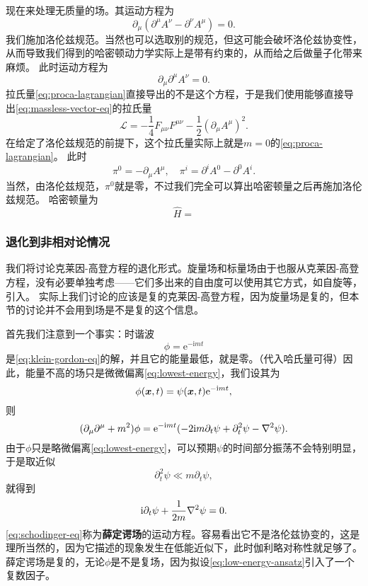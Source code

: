 \documentclass[hyperref, UTF8, a4paper]{ctexart}
\newcommand*{\ii}{\mathrm{i}}
\newcommand*{\ee}{\mathrm{e}}
\begin{document}
现在来处理无质量的场。其运动方程为
\[
    \partial_\mu (\partial^\mu A^\nu - \partial^\nu A^\mu) = 0.
\]
我们施加洛伦兹规范。当然也可以选取别的规范，但这可能会破坏洛伦兹协变性，从而导致我们得到的哈密顿动力学实际上是带有约束的，从而给之后做量子化带来麻烦。
此时运动方程为
\begin{equation}
    \partial_\mu \partial^\mu A^\nu = 0.
    \label{eq:massless-vector-eq}
\end{equation}
拉氏量\eqref{eq:proca-lagrangian}直接导出的不是这个方程，于是我们使用能够直接导出\eqref{eq:massless-vector-eq}的拉氏量
\begin{equation}
    \mathcal{L} = - \frac{1}{4} F_{\mu \nu} F^{\mu \nu} - \frac{1}{2} (\partial_\mu A^\mu)^2.
\end{equation}
在给定了洛伦兹规范的前提下，这个拉氏量实际上就是$m=0$的\eqref{eq:proca-lagrangian}。
此时
\begin{equation}
    \pi^0 = -\partial_\mu A^\mu, \quad \pi^i = \partial^i A^0 - \partial^0 A^i.
\end{equation}
当然，由洛伦兹规范，$\pi^0$就是零，不过我们完全可以算出哈密顿量之后再施加洛伦兹规范。
哈密顿量为 %
\begin{equation}
    \hat{H} = 
\end{equation}

\subsubsection{退化到非相对论情况}

我们将讨论克莱因-高登方程的退化形式。旋量场和标量场由于也服从克莱因-高登方程，没有必要单独考虑——它们多出来的自由度可以使用其它方式，如自旋等，引入。
实际上我们讨论的应该是复的克莱因-高登方程，因为旋量场是复的，但本节的讨论并不会用到场是不是复的这个信息。

首先我们注意到一个事实：时谐波
\begin{equation}
    \phi = \ee^{- \ii m t}
    \label{eq:lowest-energy}
\end{equation}
是\eqref{eq:klein-gordon-eq}的解，并且它的能量最低，就是零。（代入哈氏量可得）因此，能量不高的场只是微微偏离\eqref{eq:lowest-energy}，我们设其为
\begin{equation}
    \phi(\vb*{x}, t) = \psi(\vb*{x}, t) \ee^{- \ii m t},
    \label{eq:low-energy-ansatz}
\end{equation}
则
\[
    (\partial_\mu \partial^\mu + m^2) \phi = \ee^{- \ii m t} (-2 \ii m \partial_t \psi + \partial_t^2 \psi - \laplacian{\psi}).
\]
由于$\phi$只是略微偏离\eqref{eq:lowest-energy}，可以预期$\psi$的时间部分振荡不会特别明显，于是取近似
\[
    \partial_t^2 \psi \ll m \partial_t \psi,
\]
就得到
\begin{equation}
    \ii \partial_t \psi + \frac{1}{2m} \laplacian{\psi} = 0.
    \label{eq:schodinger-eq}
\end{equation}
\eqref{eq:schodinger-eq}称为\textbf{薛定谔场}的运动方程。容易看出它不是洛伦兹协变的，这是理所当然的，因为它描述的现象发生在低能近似下，此时伽利略对称性就足够了。
薛定谔场是复的，无论$\phi$是不是复场，因为拟设\eqref{eq:low-energy-ansatz}引入了一个复数因子。
\end{document}
